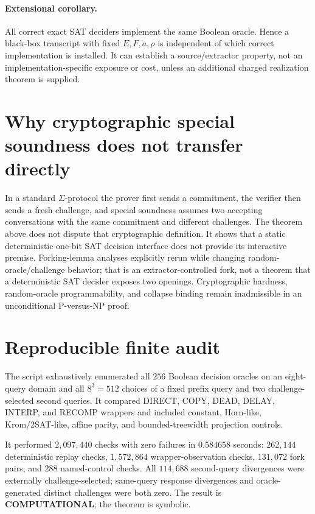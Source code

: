 \documentclass[11pt]{article}
\newcommand{\st}[1]{\textbf{#1}}
\begin{document}
\paragraph{Extensional corollary.}
All correct exact SAT deciders implement the same Boolean oracle.  Hence a
black-box transcript with fixed $E,F,a,\rho$ is independent of which correct
implementation is installed.  It can establish a source/extractor property,
not an implementation-specific exposure or cost, unless an additional charged
realization theorem is supplied.

\section*{Why cryptographic special soundness does not transfer directly}

In a standard $\Sigma$-protocol the prover first sends a commitment, the
verifier then sends a fresh challenge, and special soundness assumes two
accepting conversations with the same commitment and different challenges.
The theorem above does not dispute that cryptographic definition.  It shows
that a static deterministic one-bit SAT decision interface does not provide
its interactive premise.  Forking-lemma analyses explicitly rerun while
changing random-oracle/challenge behavior; that is an extractor-controlled
fork, not a theorem that a deterministic SAT decider exposes two openings.
Cryptographic hardness, random-oracle programmability, and collapse binding
remain inadmissible in an unconditional P-versus-NP proof.

\section*{Reproducible finite audit}

The script
exhaustively enumerated all $256$ Boolean decision oracles on an eight-query
domain and all $8^3=512$ choices of a fixed prefix query and two
challenge-selected second queries.  It compared DIRECT, COPY, DEAD, DELAY,
INTERP, and RECOMP wrappers and included constant, Horn-like, Krom/2SAT-like,
affine parity, and bounded-treewidth projection controls.

It performed $2{,}097{,}440$ checks with zero failures in $0.584658$ seconds:
$262{,}144$ deterministic replay checks, $1{,}572{,}864$ wrapper-observation
checks, $131{,}072$ fork pairs, and $288$ named-control checks.  All $114{,}688$
second-query divergences were externally challenge-selected; same-query
response divergences and oracle-generated distinct challenges were both zero.
The result is \st{COMPUTATIONAL}; the theorem is symbolic.
\end{document}

